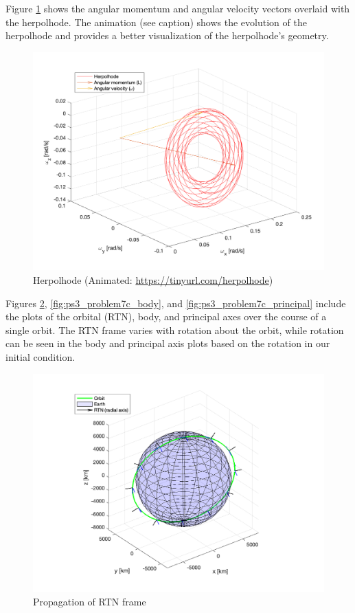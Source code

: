 Figure \ref{fig:ps3_problem7b} shows the angular momentum and angular velocity vectors overlaid with the herpolhode. The animation (see caption) shows the evolution of the herpolhode and provides a better visualization of the herpolhode's geometry. 

\begin{figure}[H]
\centering
\includegraphics[scale=0.6]{Images/ps3_problem7b.png}
\caption{Herpolhode (Animated: \protect\url{https://tinyurl.com/herpolhode})}
\label{fig:ps3_problem7b}
\end{figure}

Figures \ref{fig:ps3_problem7c_rtn}, \ref{fig:ps3_problem7c_body}, and \ref{fig:ps3_problem7c_principal} include the plots of the orbital (RTN), body, and principal axes over the course of a single orbit. The RTN frame varies with rotation about the orbit, while rotation can be seen in the body and principal axis plots based on the rotation in our initial condition.

\begin{figure}[H]
\centering
\includegraphics[scale=0.7]{Images/ps3_problem7c_rtn.png}
\caption{Propagation of RTN frame}
\label{fig:ps3_problem7c_rtn}
\end{figure}

